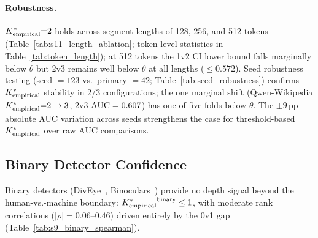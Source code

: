 \paragraph{Robustness.}
\label{sec:robustness}
${K^*_{\text{empirical}}}{=}2$ holds across segment lengths of 128, 256, and 512 tokens (Table~\ref{tab:s11_length_ablation}; token-level statistics in Table~\ref{tab:token_length}); at 512 tokens the 1v2 CI lower bound falls marginally below $\theta$ but 2v3 remains well below $\theta$ at all lengths ($\leq 0.572$).
Seed robustness testing (seed $= 123$ vs.\ primary $= 42$; Table~\ref{tab:seed_robustness}) confirms ${K^*_{\text{empirical}}}$ stability in 2/3 configurations; the one marginal shift (Qwen-Wikipedia ${K^*_{\text{empirical}}}{=}2 \to 3$, 2v3 $\text{AUC} = 0.607$) has one of five folds below $\theta$.
The ${\pm}9$\,pp absolute AUC variation across seeds strengthens the case for threshold-based ${K^*_{\text{empirical}}}$ over raw AUC comparisons.

\subsection{Binary Detector Confidence}
\label{sec:binary_confidence}

Binary detectors (DivEye~\cite{basani2026diveye}, Binoculars~\cite{hans2024binoculars}) provide no depth signal beyond the human-vs.-machine boundary: ${K^*_{\text{empirical}}}^{\text{binary}} \leq 1$, with moderate rank correlations ($|\rho| = 0.06$--$0.46$) driven entirely by the 0v1 gap (Table~\ref{tab:s9_binary_spearman}).
